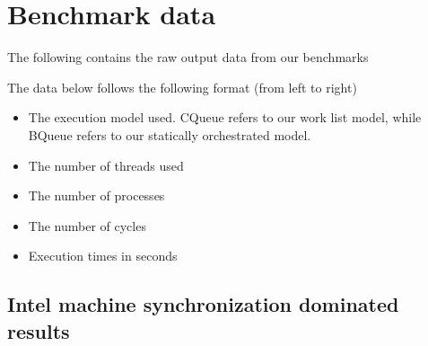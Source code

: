 \chapter{Benchmark data}
\label{chap:benchdata}
The following contains the raw output data from our benchmarks

The data below follows the following format (from left to right)

\begin{itemize}
\item The execution model used. CQueue refers to our work list
  model, while BQueue refers to our statically orchestrated model.
\item The number of threads used
\item The number of processes
\item The number of cycles
\item Execution times in seconds
\end{itemize}

\small

\section{Intel machine synchronization dominated results}
